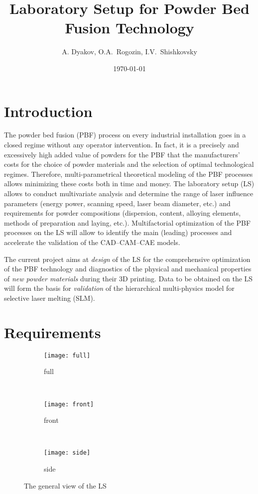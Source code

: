 \documentclass{article}
\title{Laboratory Setup for Powder Bed Fusion Technology}
\date{\today}
\author{A. Dyakov, O.A.~Rogozin, I.V.~Shishkovsky}
\begin{document}
\maketitle
\tableofcontents

\section{Introduction}

The powder bed fusion (PBF) process on every industrial installation goes in a closed regime without any operator intervention.
In fact, it is a precisely and excessively high added value of powders for the PBF that the manufacturers' costs for the choice of powder materials
and the selection of optimal technological regimes.
Therefore, multi-parametrical theoretical modeling of the PBF processes allows minimizing these costs both in time and money.
The laboratory setup (LS) allows to conduct multivariate analysis and determine the range of laser influence parameters
(energy power, scanning speed, laser beam diameter, etc.) and requirements for powder compositions
(dispersion, content, alloying elements, methods of preparation and laying, etc.).
Multifactorial optimization of the PBF processes on the LS will allow to identify the main (leading) processes
and accelerate the validation of the CAD--CAM--CAE models.

The current project aims at \emph{design} of the LS for the comprehensive optimization of the PBF technology
and diagnostics of the physical and mechanical properties of \emph{new powder materials} during their 3D printing.
Data to be obtained on the LS will form the basis for \emph{validation}
of the hierarchical multi-physics model for selective laser melting (SLM).

\section{Requirements}

\begin{figure}
    \newcommand{\picwidth}{0.7\textwidth}
    \centering
    \begin{subfigure}{\picwidth}
        \texttt{[image: full]}
        \caption{full}
        \label{fig:full}
    \end{subfigure}\\
    \begin{subfigure}{\picwidth}
        \texttt{[image: front]}
        \caption{front}
        \label{fig:front}
    \end{subfigure}\\
    \begin{subfigure}{\picwidth}
        \texttt{[image: side]}
        \caption{side}
        \label{fig:side}
    \end{subfigure}
    \caption{The general view of the LS}
    \label{fig:ls}
\end{figure}
\end{document}
